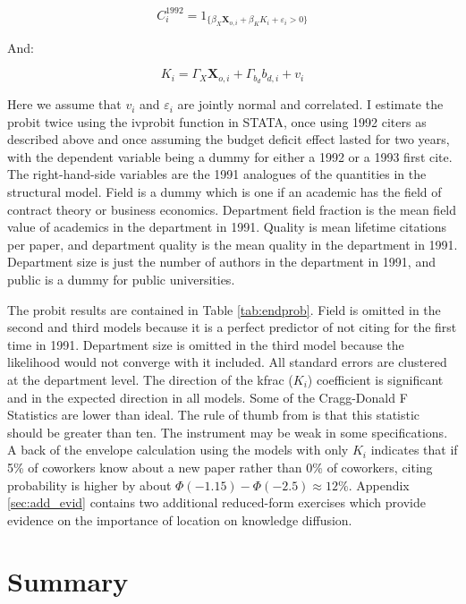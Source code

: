 \begin{equation}
    C^{1992}_i = 1_{\{ \beta_X \mathbf{X}_{o,i} + \beta_K K_i + \varepsilon_i > 0\}}
\end{equation}

And:

\begin{equation}
    K_i = \Gamma_X \mathbf{X}_{o,i} + \Gamma_{b_d} b_{d,i} + v_i
\end{equation}

Here we assume that $v_i$ and $\varepsilon_i$ are jointly normal and
correlated. I estimate the probit twice using the ivprobit function in
STATA, once using 1992 citers as described above and once assuming the
budget deficit effect lasted for two years, with the dependent variable
being a dummy for either a 1992 or a 1993 first cite. The
right-hand-side variables are the 1991 analogues of the quantities in
the structural model. Field is a dummy which is one if an academic has the
field of contract theory or business economics. Department field
fraction is the mean field value of academics in the department in 1991.
Quality is mean lifetime citations per paper, and department quality is
the mean quality in the department in 1991. Department size is just the
number of authors in the department in 1991, and public is a dummy for
public universities. 


The probit results are contained in Table \ref{tab:endprob}.  Field is
omitted in the second and third models
because it is a perfect predictor of not citing for the first time in
1991. Department size is omitted in the third model because the
likelihood would not converge with it included. All standard errors are 
clustered at the department level.  The direction of the
kfrac ($K_i$) coefficient is significant and in the expected direction
in all models. Some of the Cragg-Donald F Statistics are lower than ideal.
The rule of thumb from \citet{staiger1997instrumental} is that this statistic
should be greater than ten.  The instrument may be weak in some specifications.
A back of the envelope calculation using the models with
only $K_i$ indicates that if 5\% of coworkers know
about a new paper rather than 0\% of coworkers, citing probability is higher 
by about $\Phi(-1.15) - \Phi(-2.5) \approx 12\%$.  Appendix \ref{sec:add_evid}
 contains two additional reduced-form exercises which provide
 evidence on the importance of location on knowledge diffusion.

\section{Summary}

